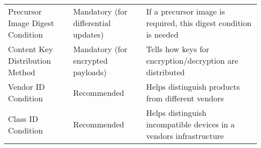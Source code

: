 \begin{longtable}[]{@{}lll@{}}
\begin{minipage}[t]{0.23\columnwidth}
Precursor Image Digest Condition\strut
\end{minipage} & \begin{minipage}[t]{0.26\columnwidth}\raggedright\strut
Mandatory (for differential updates)\strut
\end{minipage} & \begin{minipage}[t]{0.42\columnwidth}\raggedright\strut
If a precursor image is required, this digest condition is needed\strut
\end{minipage}\tabularnewline
\begin{minipage}[t]{0.23\columnwidth}\raggedright\strut
Content Key Distribution Method\strut
\end{minipage} & \begin{minipage}[t]{0.26\columnwidth}\raggedright\strut
Mandatory (for encrypted payloads)\strut
\end{minipage} & \begin{minipage}[t]{0.42\columnwidth}\raggedright\strut
Tells how keys for encryption/decryption are distributed\strut
\end{minipage}\tabularnewline
\begin{minipage}[t]{0.23\columnwidth}\raggedright\strut
Vendor ID Condition\strut
\end{minipage} & \begin{minipage}[t]{0.26\columnwidth}\raggedright\strut
Recommended\strut
\end{minipage} & \begin{minipage}[t]{0.42\columnwidth}\raggedright\strut
Helps distinguish products from different vendors\strut
\end{minipage}\tabularnewline
\begin{minipage}[t]{0.23\columnwidth}\raggedright\strut
Class ID Condition\strut
\end{minipage} & \begin{minipage}[t]{0.26\columnwidth}\raggedright\strut
Recommended\strut
\end{minipage} & \begin{minipage}[t]{0.42\columnwidth}\raggedright\strut
Helps distinguish incompatible devices in a vendors infrastructure\strut
\end{minipage}\tabularnewline
\bottomrule
\end{longtable}
